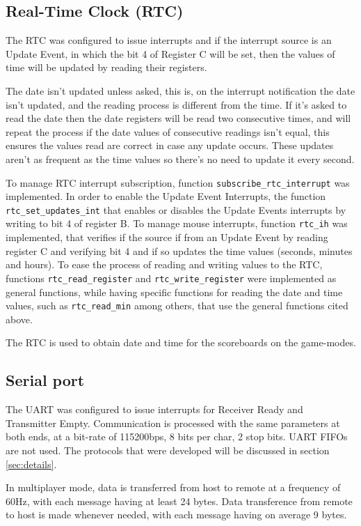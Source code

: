 \documentclass{article}
\theoremstyle{remark}
\begin{document}
\subsection{Real-Time Clock (RTC)}
The RTC was configured to issue interrupts and if the interrupt source is an Update Event, in which the bit 4 of Register C will be set, then the values of time will be updated by reading their registers.\par
The date isn't updated unless asked, this is, on the interrupt notification the date isn't updated, and the reading process is different from the time. If it's asked to read the date then the date registers will be read two consecutive times, and will repeat the process if the date values of consecutive readings isn't equal, this ensures the values read are correct in case any update occurs. These updates aren't as frequent as the time values so there's no need to update it every second.\par
To manage RTC interrupt subscription, function \texttt{subscribe\_rtc\_interrupt} was implemented. In order to enable the Update Event Interrupts, the function \texttt{rtc\_set\_updates\_int} that enables or disables the Update Events interrupts by writing to bit 4 of register B. To manage mouse interrupts, function \texttt{rtc\_ih} was implemented, that verifies if the source if from an Update Event by reading register C and verifying bit 4 and if so updates the time values (seconds, minutes and hours). To ease the process of reading and writing values to the RTC, functions \texttt{rtc\_read\_register} and \texttt{rtc\_write\_register} were implemented as general functions, while having specific functions for reading the date and time values, such as \texttt{rtc\_read\_min} among others, that use the general functions cited above.\par
The RTC is used to obtain date and time for the scoreboards on the game-modes.

\subsection{Serial port}
The UART was configured to issue interrupts for Receiver Ready and Transmitter Empty. Communication is processed with the same parameters at both ends, at a bit-rate of 115200bps, 8 bits per char, 2 stop bits. UART FIFOs are not used. The protocols that were developed will be discussed in section \ref{sec:details}. \par
In multiplayer mode, data is transferred from host to remote at a frequency of 60Hz, with each message having at least 24 bytes. Data transference from remote to host is made whenever needed, with each message having on average 9 bytes.
\pagebreak
\end{document}
